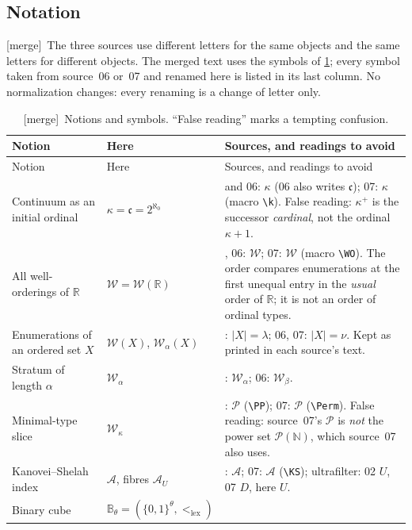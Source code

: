 \documentclass[11pt,a4paper]{article}
\theoremstyle{definition}
\theoremstyle{remark}
\newcommand{\R}{\mathbb R}
\newcommand{\N}{\mathbb N}
\newcommand{\W}{\mathcal W}
\newcommand{\A}{\mathcal A}
\newcommand{\B}{\mathbb B}
\newcommand{\two}{\{0,1\}}
\newcommand{\lex}{\mathrm{lex}}
\newcommand{\con}{\mathfrak c}
\newcommand{\merge}{\textsf{[merge]}}
\begin{document}
\subsection{Notation}\label{lwo:sec:notation}
\merge\ The three sources use different letters for the same objects and the
same letters for different objects. The merged text uses the symbols of
\cref{lwo:tab:notation}; every symbol taken from source~06 or~07 and renamed
here is listed in its last column. No normalization changes: every renaming
is a change of letter only.

{\small
\renewcommand{\arraystretch}{1.15}
\begin{longtable}{@{}>{\raggedright\arraybackslash}p{}>{\raggedright\arraybackslash}p{}>{\raggedright\arraybackslash}p{}@{}}
\caption{\merge\ Notions and symbols. ``False reading'' marks a tempting
confusion.}\label{lwo:tab:notation}\\
\toprule
Notion & Here & Sources, and readings to avoid\\
\midrule
\endfirsthead
\toprule
Notion & Here & Sources, and readings to avoid\\
\midrule
\endhead
\bottomrule
\endfoot
Continuum as an initial ordinal & $\kappa=\con=2^{\aleph_0}$ &
02 and 06: $\kappa$ (06 also writes $\con$); 07: $\kappa$ (macro \texttt{\textbackslash k}).
False reading: $\kappa^+$ is the successor \emph{cardinal}, not the ordinal $\kappa+1$.\\
All well-orderings of $\R$ & $\W=\W(\R)$ &
02, 06: $\W$; 07: $\W$ (macro \texttt{\textbackslash WO}). The order compares
enumerations at the first unequal entry in the \emph{usual} order of $\R$; it is
not an order of ordinal types.\\
Enumerations of an ordered set $X$ & $\W(X)$, $\W_\alpha(X)$ &
02: $|X|=\lambda$; 06, 07: $|X|=\nu$. Kept as printed in each source's text.\\
Stratum of length $\alpha$ & $\W_\alpha$ & 02: $\W_\alpha$; 06: $\W_\beta$.\\
Minimal-type slice & $\W_\kappa$ &
06: $\mathcal P$ (\texttt{\textbackslash PP}); 07: $\mathcal P$ (\texttt{\textbackslash Perm}).
False reading: source~07's $\mathcal P$ is \emph{not} the power set
$\mathcal P(\N)$, which source~07 also uses.\\
Kanovei--Shelah index & $\A$, fibres $\A_U$ & 02: $\A$; 07: $\mathcal A$
(\texttt{\textbackslash KS}); ultrafilter: 02 $U$, 07 $D$, here $U$.\\
Binary cube & $\B_\theta=(\two^\theta,<_\lex)$ &

\end{longtable}}
\end{document}

